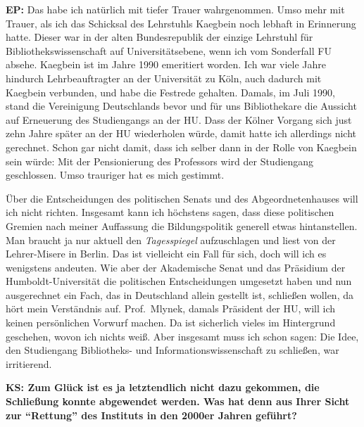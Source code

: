 \documentclass[a4paper,
fontsize=11pt,
oneside,
numbers=noperiodatend,
parskip=half-,
bibliography=totoc,
final
]{scrartcl}
\begin{document}
\textbf{EP:} Das habe ich natürlich mit tiefer Trauer wahrgenommen. Umso
mehr mit Trauer, als ich das Schicksal des Lehrstuhls Kaegbein noch
lebhaft in Erinnerung hatte. Dieser war in der alten Bundesrepublik der
einzige Lehrstuhl für Bibliothekswissenschaft auf Universitätsebene,
wenn ich vom Sonderfall FU absehe. Kaegbein ist im Jahre 1990 emeritiert
worden. Ich war viele Jahre hindurch Lehrbeauftragter an der Universität
zu Köln, auch dadurch mit Kaegbein verbunden, und habe die Festrede
gehalten. Damals, im Juli 1990, stand die Vereinigung Deutschlands bevor
und für uns Bibliothekare die Aussicht auf Erneuerung des Studiengangs
an der HU. Dass der Kölner Vorgang sich just zehn Jahre später an der HU
wiederholen würde, damit hatte ich allerdings nicht gerechnet. Schon gar
nicht damit, dass ich selber dann in der Rolle von Kaegbein sein würde:
Mit der Pensionierung des Professors wird der Studiengang geschlossen.
Umso trauriger hat es mich gestimmt.

Über die Entscheidungen des politischen Senats und des
Abgeordnetenhauses will ich nicht richten. Insgesamt kann ich höchstens
sagen, dass diese politischen Gremien nach meiner Auffassung die
Bildungspolitik generell etwas hintanstellen. Man braucht ja nur aktuell
den \emph{Tagesspiegel} aufzuschlagen und liest von der Lehrer-Misere in
Berlin. Das ist vielleicht ein Fall für sich, doch will ich es
wenigstens andeuten. Wie aber der Akademische Senat und das Präsidium
der Humboldt-Universität die politischen Entscheidungen umgesetzt haben
und nun ausgerechnet ein Fach, das in Deutschland allein gestellt ist,
schließen wollen, da hört mein Verständnis auf. Prof.~Mlynek, damals
Präsident der HU, will ich keinen persönlichen Vorwurf machen. Da ist
sicherlich vieles im Hintergrund geschehen, wovon ich nichts weiß. Aber
insgesamt muss ich schon sagen: Die Idee, den Studiengang Bibliotheks-
und Informationswissenschaft zu schließen, war irritierend.

\textbf{KS: Zum Glück ist es ja letztendlich nicht dazu gekommen, die
Schließung konnte abgewendet werden. Was hat denn aus Ihrer Sicht zur
\enquote{Rettung} des Instituts in den 2000er Jahren geführt?}
\end{document}
